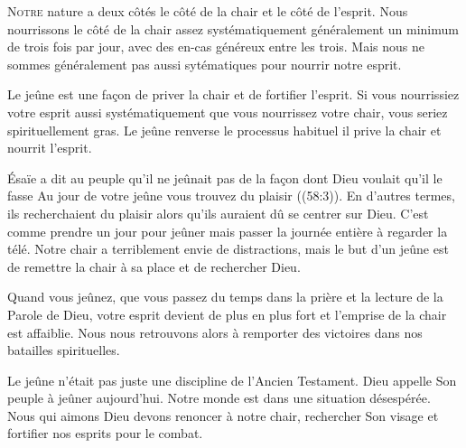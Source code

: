 \dvrule







\lettrine{N}{otre} nature a deux côtés\frcolon{}
 le côté de la chair et le côté de l'esprit.
 Nous nourrissons le côté de la chair assez systématiquement
 \ocadr généralement un minimum de trois fois par jour,
 avec des en-cas généreux entre les trois.
 Mais nous ne sommes généralement pas aussi sytématiques
 pour nourrir notre esprit. 

Le jeûne est une fa\c{c}on de priver la chair et de fortifier l'esprit.
 Si vous nourrissiez votre esprit aussi systématiquement
 que vous nourrissez votre chair, vous seriez spirituellement gras.
 Le jeûne renverse le processus habituel
 \ocadr il prive la chair et nourrit l'esprit. 


Ésaïe a dit au peuple qu'il ne jeûnait pas de la fa\c{c}on dont Dieu
 voulait qu'il le fasse\frcolon{}
 \Og Au jour de votre jeûne vous trouvez du plaisir \Fg{}
 ((58:3)). En d'autres termes, ils recherchaient du plaisir
 alors qu'ils auraient dû se centrer sur Dieu. C'est comme prendre
 un jour pour jeûner mais passer la journée entière à regarder la télé.
 Notre chair a terriblement envie de distractions, mais le but d'un jeûne
 est de remettre la chair à sa place et de rechercher Dieu. 

Quand vous jeûnez, que vous passez du temps dans la prière
 et la lecture de la Parole de Dieu, votre esprit devient de plus en plus
 fort et l'emprise de la chair est affaiblie. Nous nous retrouvons alors
 à remporter des victoires dans nos batailles spirituelles. 

Le jeûne n'était pas juste une discipline de l'Ancien Testament.
 Dieu appelle Son peuple à jeûner aujourd'hui.
 Notre monde est dans une situation désespérée.
 Nous qui aimons Dieu devons renoncer à notre chair,
 rechercher Son visage et fortifier nos esprits pour le combat. 

